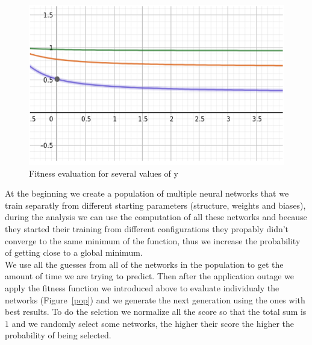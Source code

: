 \documentclass[10pt,a4paper,oneside]{article}
\begin{document}
\vspace{0.8cm}

\begin{figure}[!ht]
\centering
\includegraphics[scale=0.5]{./images/fitness.png}
\caption{Fitness evaluation for several values of y}
\label{fonction}
\end{figure}

\vspace{0.8cm}

\begin{multicols}{2}
At the beginning we create a population of multiple neural networks that we train separatly from different starting parameters (structure, weights and biases), during the analysis we can use the computation of all these networks and because they started their training from different configurations they propably didn't converge to the same minimum of the function, thus we increase the probability of getting close to a global minimum. 
\\We use all the guesses from all of the networks in the population to get the amount of time we are trying to predict. Then after the application outage we apply the fitness function we introduced above to evaluate individualy the networks (Figure~\ref{pop}) and we generate the next generation using the ones with best results. To do the selction we normalize all the score so that the total sum is $1$ and we randomly select some networks, the higher their score the higher the probability of being selected.
\end{multicols}

\vspace{0.8cm}
\end{document}
